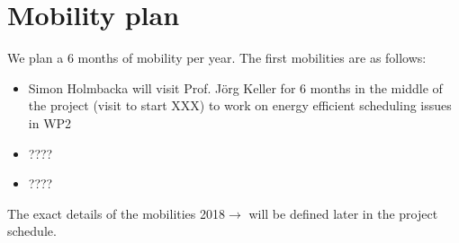\documentclass{article}
\begin{document}
\section{Mobility plan}
We plan a 6 months of mobility per year. The first mobilities are as follows:
\begin{itemize}
 \item Simon Holmbacka will visit Prof. Jörg Keller for 6 months in the middle
of the project (visit to start XXX) to work on energy efficient scheduling issues in WP2
\item ????
\item ????

\end{itemize}


The exact details of the mobilities 2018$\longrightarrow$ will be defined later in the project
schedule.






\end{document}
